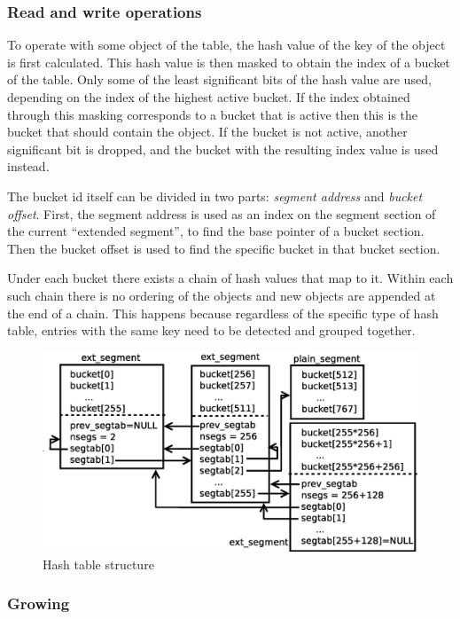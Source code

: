\documentclass[aps,pre,preprint,nofootinbib]{revtex4}
\begin{document}
\subsubsection{Read and write operations}

To operate with some object of the table, the hash value of the key of the object is first calculated.
This hash value is then masked to obtain the index of a bucket of the table.
Only some of the least significant bits of the hash value are used, depending on the index of the highest active bucket.
If the index obtained through this masking corresponds to a bucket that is active then this is the bucket that should contain the object.
If the bucket is not active, another significant bit is dropped, and the bucket with the resulting index value is used instead.

The bucket id itself can be divided in two parts: \emph{segment address} and \emph{bucket offset}.
First, the segment address is used as an index on the segment section of the current ``extended segment'', to find the base pointer of a bucket section.
Then the bucket offset is used to find the specific bucket in that bucket section.

Under each bucket there exists a chain of hash values that map to it.
Within each such chain there is no ordering of the objects and new objects are appended at the end of a chain.
This happens because regardless of the specific type of hash table, entries with the same key need to be detected and grouped together.

\begin{figure}[htb]
\centering
\includegraphics[width=1.0\textwidth]{hash_table_structure.eps}
\caption{Hash table structure}
\label{fig:hash_table_structure}
\end{figure}

\subsubsection{Growing}
\end{document}
